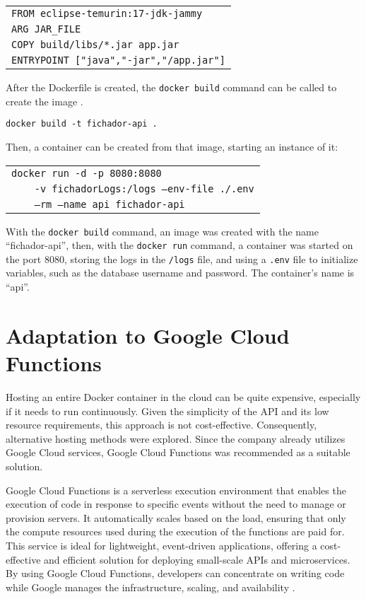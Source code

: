 \begin{tabular}{l}
    \texttt{FROM eclipse-temurin:17-jdk-jammy} \\
    \texttt{ARG JAR\_FILE} \\
    \texttt{COPY build/libs/*.jar app.jar} \\
    \texttt{ENTRYPOINT ["java","-jar","/app.jar"]}
\end{tabular}

After the Dockerfile is created, the \texttt{docker build} command can be called to create the 
image \cite{docker_docs}.

\begin{center}
    \texttt{docker build -t fichador-api .}
\end{center}

Then, a container can be created from that image, starting an instance of it:


\begin{tabular}{l}
    \texttt{docker run -d -p 8080:8080} \\
    \texttt{\ \ \ \ -v fichadorLogs:/logs --env-file ./.env} \\
    \texttt{\ \ \ \ --rm --name api fichador-api}
\end{tabular}

With the \texttt{docker build} command, an image was created with the name ``fichador-api'', then, 
with the \texttt{docker run} command, a container was started on the port 8080, storing the logs 
in the \texttt{/logs} file, and using a \texttt{.env} file to initialize variables, such as the 
database username and password. The container's name is ``api''.


\section{Adaptation to Google Cloud Functions}

Hosting an entire Docker container in the cloud can be quite expensive, especially if it needs to 
run continuously. Given the simplicity of the API and its low resource requirements, this approach 
is not cost-effective. Consequently, alternative hosting methods were explored. Since the company 
already utilizes Google Cloud services, Google Cloud Functions was recommended as a suitable 
solution.

Google Cloud Functions is a serverless execution environment that enables the execution of code in 
response to specific events without the need to manage or provision servers. It automatically 
scales based on the load, ensuring that only the compute resources used during the execution of 
the functions are paid for. This service is ideal for lightweight, event-driven applications, 
offering a cost-effective and efficient solution for deploying small-scale APIs and microservices. 
By using Google Cloud Functions, developers can concentrate on writing code while Google manages 
the infrastructure, scaling, and availability \cite{google_cloud_functions}.

